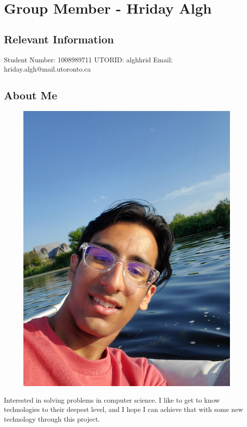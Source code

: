 \documentclass{article}
\begin{document}
\noindent\makebox[\linewidth]{\rule{\paperwidth}{0.4pt}}

\section{Group Member - Hriday Algh}
\subsection{Relevant Information}
    Student Number: 1008989711 \newline
    UTORID: alghhrid \newline
    Email: hriday.algh@mail.utoronto.ca
\subsection{About Me}
\begin{figure}[h]
    \centering
    \includegraphics[width=0.25\linewidth]{images/HridayPhoto.jpg}
\end{figure}
Interested in solving problems in computer science. I like to get to know technologies to their deepest level, and I hope I can achieve that with some new technology through this project.
\end{document}
